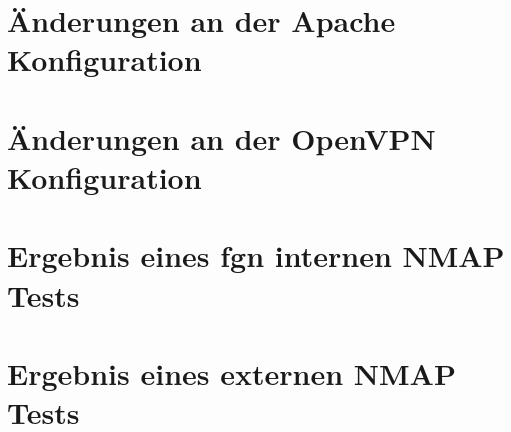 \documentclass[11pt,a4paper,titlepage=firstiscover]{scrartcl} %
\begin{document}
\section{Änderungen an der Apache Konfiguration}\label{sec:Apache-Konfig}
\newpage
\section{Änderungen an der OpenVPN Konfiguration}\label{sec:VPN-Konfig}
\newpage
\section{Ergebnis eines fgn internen NMAP Tests}\label{sec:NMAP-Test-int}
\newpage
\section{Ergebnis eines externen NMAP Tests}\label{sec:NMAP-Test-ext}

%
%
\end{document}
